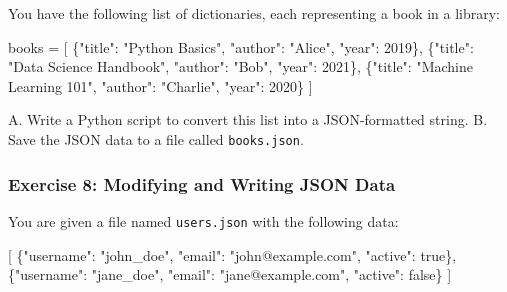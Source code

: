 \documentclass[
  letterpaper,
  DIV=11,
  numbers=noendperiod]{scrreprt}
\newenvironment{Shaded}{\begin{snugshade}}{\end{snugshade}}
\newcommand{\DataTypeTok}[1]{\textcolor[rgb]{0.68,0.00,0.00}{#1}}
\newcommand{\DecValTok}[1]{\textcolor[rgb]{0.68,0.00,0.00}{#1}}
\newcommand{\FunctionTok}[1]{\textcolor[rgb]{0.28,0.35,0.67}{#1}}
\newcommand{\KeywordTok}[1]{\textcolor[rgb]{0.00,0.23,0.31}{#1}}
\newcommand{\NormalTok}[1]{\textcolor[rgb]{0.00,0.23,0.31}{#1}}
\newcommand{\OperatorTok}[1]{\textcolor[rgb]{0.37,0.37,0.37}{#1}}
\newcommand{\OtherTok}[1]{\textcolor[rgb]{0.00,0.23,0.31}{#1}}
\newcommand{\StringTok}[1]{\textcolor[rgb]{0.13,0.47,0.30}{#1}}
\begin{document}
You have the following list of dictionaries, each representing a book in
a library:

\begin{Shaded}
\begin{Highlighting}[]
\NormalTok{books }\OperatorTok{=}\NormalTok{ [}
\NormalTok{    \{}\StringTok{"title"}\NormalTok{: }\StringTok{"Python Basics"}\NormalTok{, }\StringTok{"author"}\NormalTok{: }\StringTok{"Alice"}\NormalTok{, }\StringTok{"year"}\NormalTok{: }\DecValTok{2019}\NormalTok{\},}
\NormalTok{    \{}\StringTok{"title"}\NormalTok{: }\StringTok{"Data Science Handbook"}\NormalTok{, }\StringTok{"author"}\NormalTok{: }\StringTok{"Bob"}\NormalTok{, }\StringTok{"year"}\NormalTok{: }\DecValTok{2021}\NormalTok{\},}
\NormalTok{    \{}\StringTok{"title"}\NormalTok{: }\StringTok{"Machine Learning 101"}\NormalTok{, }\StringTok{"author"}\NormalTok{: }\StringTok{"Charlie"}\NormalTok{, }\StringTok{"year"}\NormalTok{: }\DecValTok{2020}\NormalTok{\}}
\NormalTok{]}
\end{Highlighting}
\end{Shaded}

A. Write a Python script to convert this list into a JSON-formatted
string. B. Save the JSON data to a file called \texttt{books.json}.

\hypertarget{exercise-8-modifying-and-writing-json-data}{%
\subsubsection{Exercise 8: Modifying and Writing JSON
Data}\label{exercise-8-modifying-and-writing-json-data}}

You are given a file named \texttt{users.json} with the following data:

\begin{Shaded}
\begin{Highlighting}[]
\OtherTok{[}
    \FunctionTok{\{}\DataTypeTok{"username"}\FunctionTok{:} \StringTok{"john\_doe"}\FunctionTok{,} \DataTypeTok{"email"}\FunctionTok{:} \StringTok{"john@example.com"}\FunctionTok{,} \DataTypeTok{"active"}\FunctionTok{:} \KeywordTok{true}\FunctionTok{\}}\OtherTok{,}
    \FunctionTok{\{}\DataTypeTok{"username"}\FunctionTok{:} \StringTok{"jane\_doe"}\FunctionTok{,} \DataTypeTok{"email"}\FunctionTok{:} \StringTok{"jane@example.com"}\FunctionTok{,} \DataTypeTok{"active"}\FunctionTok{:} \KeywordTok{false}\FunctionTok{\}}
\OtherTok{]}
\end{Highlighting}
\end{Shaded}
\end{document}
